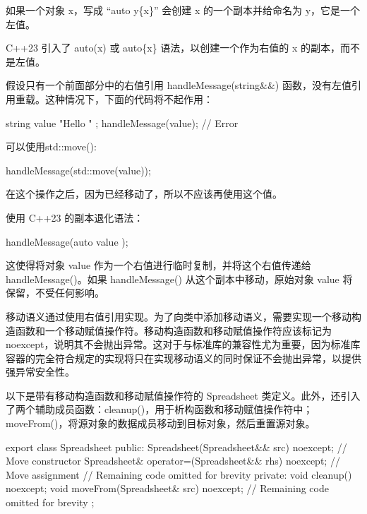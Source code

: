 
如果一个对象 x，写成 “auto y\{x\}” 会创建 x 的一个副本并给命名为 y，它是一个左值。

C++23 引入了 auto(x) 或 auto\{x\} 语法，以创建一个作为右值的 x 的副本，而不是左值。

假设只有一个前面部分中的右值引用 handleMessage(string\&\&) 函数，没有左值引用重载。这种情况下，下面的代码将不起作用：

\begin{cpp}
string value { "Hello " };
handleMessage(value); // Error
\end{cpp}

可以使用std::move():

\begin{cpp}
handleMessage(std::move(value));
\end{cpp}

在这个操作之后，因为已经移动了，所以不应该再使用这个值。

使用 C++23 的副本退化语法：

\begin{cpp}
handleMessage(auto { value });
\end{cpp}

这使得将对象 value 作为一个右值进行临时复制，并将这个右值传递给 handleMessage()。如果 handleMessage() 从这个副本中移动，原始对象 value 将保留，不受任何影响。


移动语义通过使用右值引用实现。为了向类中添加移动语义，需要实现一个移动构造函数和一个移动赋值操作符。移动构造函数和移动赋值操作符应该标记为 noexcept，说明其不会抛出异常。这对于与标准库的兼容性尤为重要，因为标准库容器的完全符合规定的实现将只在实现移动语义的同时保证不会抛出异常，以提供强异常安全性。

以下是带有移动构造函数和移动赋值操作符的 Spreadsheet 类定义。此外，还引入了两个辅助成员函数：cleanup()，用于析构函数和移动赋值操作符中；moveFrom()，将源对象的数据成员移动到目标对象，然后重置源对象。

\begin{cpp}
export class Spreadsheet
{
    public:
        Spreadsheet(Spreadsheet&& src) noexcept; // Move constructor
        Spreadsheet& operator=(Spreadsheet&& rhs) noexcept; // Move assignment
        // Remaining code omitted for brevity
    private:
        void cleanup() noexcept;
        void moveFrom(Spreadsheet& src) noexcept;
        // Remaining code omitted for brevity
};
\end{cpp}

